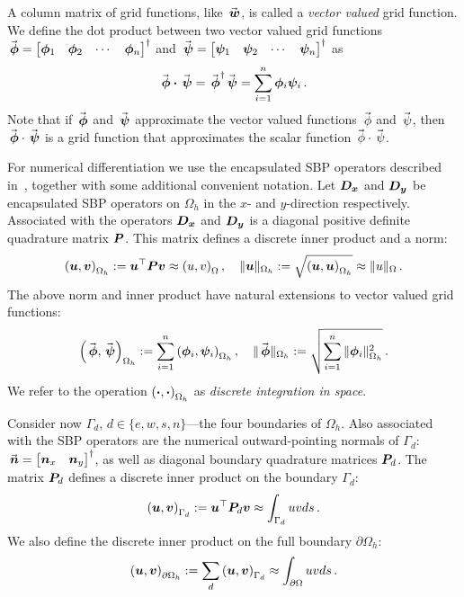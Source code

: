 A column matrix of grid functions, like $\wn$, is called a \emph{vector valued} grid function. We define the dot product between two vector valued grid functions
$
  \phin =
  \begin{bmatrix}
    \bm{\phi}_1 & \bm{\phi}_2 & \cdots & \bm{\phi}_n
  \end{bmatrix}^\dagger
$
and
$
  \psin =
  \begin{bmatrix}
    \bm{\psi}_1 & \bm{\psi}_2 & \cdots & \bm{\psi}_n
  \end{bmatrix}^\dagger
$
as
\begin{equation*}
  \phin \cdotn \psin = \phin^\dagger \psin = \sum_{i=1}^n \bm{\phi}_i \bm{\psi}_i \,.
\end{equation*}
Note that if $\phin$ and $\psin$ approximate the vector valued functions $\phic$ and $\psic$, then $\phin \cdot \psin$ is a grid function that approximates the scalar function $\phic \cdot \psic$.

For numerical differentiation we use the encapsulated SBP operators described in~\cite{aalund2019encapsulated}, together with some additional convenient notation. Let $\bm{D_x}$ and $\bm{D_y}$ be encapsulated SBP operators on $\Omega_h$ in the $x$- and $y$-direction respectively. Associated with the operators $\bm{D_x}$ and $\bm{D_y}$ is a diagonal positive definite quadrature matrix $\bm{P}$. This matrix defines a discrete inner product and a norm:
\begin{equation*}
  \left(\bm{u}, \bm{v}\right)_{\Omega_h} := \bm{u}^\top \bm{P} \bm{v} \approx \left(u, v\right)_\Omega, \quad
  \|\bm{u}\|_{\Omega_h} := \sqrt{\left(\bm{u}, \bm{u}\right)_{\Omega_h}} \approx \|u\|_{\Omega} \,.
\end{equation*}
The above norm and inner product have natural extensions to vector valued grid functions:
\begin{equation*}
  \ipn{\phin}{\psin} := \sum_{i=1}^n \ipn{\bm{\phi}_i}{\bm{\psi}_i}, \quad
  \normn{\phin} := \sqrt{\sum_{i=1}^n \normn{\bm{\phi}_i}^2} \,.
\end{equation*}
We refer to the operation
$
  \left(\bm{\cdot}, \bm{\cdot}\right)_{\Omega_h}
$
as \emph{discrete integration in space}.

Consider now $\Gamma_d$, $d \in \{e,w,s,n\}$---the four boundaries of $\Omega_h$. Also associated with the SBP operators are the numerical outward-pointing normals of $\Gamma_d$:
$
  \nn =
  \begin{bmatrix}
    \nnx & \nny
  \end{bmatrix}^\dagger
$,
as well as diagonal boundary quadrature matrices $\bm{P}_d$. The matrix $\bm{P}_d$ defines a discrete inner product on the boundary $\Gamma_d$:
\[
  \left(\bm{u}, \bm{v}\right)_{\Gamma_d} := \bm{u}^\top \bm{P}_d \bm{v} \approx \int_{\Gamma_d} uv ds \,.
\]
We also define the discrete inner product on the full boundary $\partial \Omega_h$:
\[
  \left(\bm{u}, \bm{v}\right)_{\partial \Omega_h} := \sum_d \left(\bm{u}, \bm{v}\right)_{\Gamma_d} \approx \int_{\partial \Omega} uv ds \,.
\]

